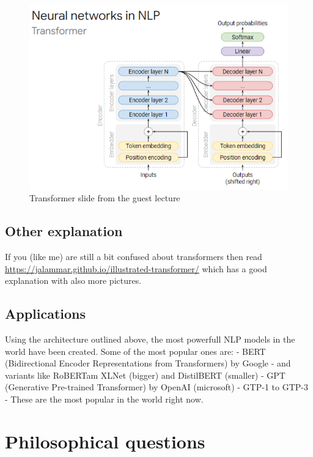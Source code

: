 \documentclass[
  11pt,
  british,
]{article}
\begin{document}
\begin{figure}
\centering
\includegraphics{Pasted_image_20220605011623.png}
\caption{Transformer slide from the guest lecture}
\end{figure}

\hypertarget{other-explanation}{%
\subsection{Other explanation}\label{other-explanation}}

If you (like me) are still a bit confused about transformers then read
\url{https://jalammar.github.io/illustrated-transformer/} which has a
good explanation with also more pictures.

\hypertarget{applications}{%
\subsection{Applications}\label{applications}}

Using the architecture outlined above, the most powerfull NLP models in
the world have been created. Some of the most popular ones are: - BERT
(Bidirectional Encoder Representations from Transformers) by Google -
and variants like RoBERTam XLNet (bigger) and DistilBERT (smaller) - GPT
(Generative Pre-trained Transformer) by OpenAI (microsoft) - GTP-1 to
GTP-3 - These are the most popular in the world right now.

\hypertarget{philosophical-questions}{%
\section{Philosophical questions}\label{philosophical-questions}}
\end{document}
